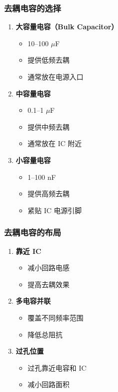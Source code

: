 \subsubsection{去耦电容的选择}

\begin{enumerate}
  \item \textbf{大容量电容（Bulk Capacitor）}
    \begin{itemize}
      \item 10--100 $\mu$F
      \item 提供低频去耦
      \item 通常放在电源入口
    \end{itemize}

  \item \textbf{中容量电容}
    \begin{itemize}
      \item 0.1--1 $\mu$F
      \item 提供中频去耦
      \item 通常放在 IC 附近
    \end{itemize}

  \item \textbf{小容量电容}
    \begin{itemize}
      \item 1--100 nF
      \item 提供高频去耦
      \item 紧贴 IC 电源引脚
    \end{itemize}
\end{enumerate}

\subsubsection{去耦电容的布局}

\begin{enumerate}
  \item \textbf{靠近 IC}
    \begin{itemize}
      \item 减小回路电感
      \item 提高去耦效果
    \end{itemize}

  \item \textbf{多电容并联}
    \begin{itemize}
      \item 覆盖不同频率范围
      \item 降低总阻抗
    \end{itemize}

  \item \textbf{过孔位置}
    \begin{itemize}
      \item 过孔靠近电容和 IC
      \item 减小回路面积
    \end{itemize}
\end{enumerate}

